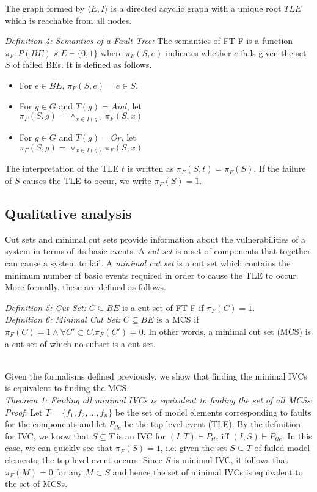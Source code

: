The graph formed by $\langle E, I \rangle$ is a directed acyclic graph with a unique root $TLE$ which is reachable from all nodes. 

\textit{Definition 4: Semantics of a Fault Tree:} The semantics of FT F is a function $\pi_F : P(BE) \times E \vdash \{0,1\}$ where $\pi_F(S, e)$ indicates whether $e$ fails given the set $S$ of failed BEs. It is defined as follows. 

\begin{itemize}
\item For $e \in BE$, $\pi_F(S,e) = e \in S$.
\item For $g \in G$ and $T(g) = And$, let\\ $\pi_F(S,g) = \land_{x \in I(g)} \pi_F(S, x)$
\item For $g \in G$ and $T(g) = Or$, let\\ $\pi_F(S,g) = \lor_{x \in I(g)} \pi_F(S, x)$ 
\end{itemize}

The interpretation of the TLE $t$ is written as $\pi_F(S,t) = \pi_F(S)$. If the failure of $S$ causes the TLE to occur, we write $\pi_F(S) = 1$. 

\subsection{Qualitative analysis}
Cut sets and minimal cut sets provide information about the vulnerabilities of a system in terms of its basic events. A \textit{cut set} is a set of components that together can cause a system to fail. A \textit{minimal cut set} is a cut set which contains the minimum number of basic events required in order to cause the TLE to occur. More formally, these are defined as follows. 

\textit{Definition 5: Cut Set:} $C \subseteq BE$ is a cut set of FT F if $\pi_F(C) = 1$. \\

\textit{Definition 6: Minimal Cut Set:} $C \subseteq BE$ is a MCS if $\pi_F(C) = 1 \land \forall C' \subset C. \pi_F(C') = 0$. In other words, a minimal cut set (MCS) is a cut set of which no subset is a cut set. 

\\
Given the formalisms defined previously, we show that finding the minimal IVCs is equivalent to finding the MCS. \\

\textit{Theorem 1: Finding all minimal IVCs is equivalent to finding the set of all MCSs}:\\
\textit{Proof}: Let $T = \{f_1, f_2, ..., f_n\}$ be the set of model elements corresponding to faults for the components and let $P_{tle}$ be the top level event (TLE). By the definition for IVC, we know that $S \subseteq T$ is an IVC for $(I, T) \vdash P_{tle}$ iff $(I, S) \vdash P_{tle}$. 
In this case, we can quickly see that $\pi_F(S) = 1$, i.e. given the set $S \subseteq T$ of failed model elements, the top level event occurs. 
Since $S$ is minimal IVC, it follows that $\pi_F(M) = 0$ for any $M \subset S$ and hence the set of minimal IVCs is equivalent to the set of MCSs. 


